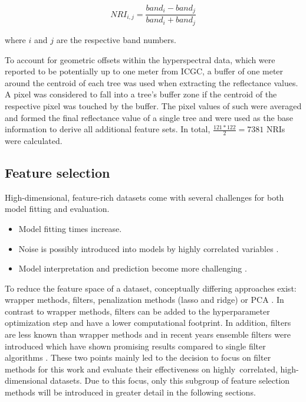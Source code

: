 \documentclass[remotesensing,article,submit,moreauthors,pdftex]{Definitions/mdpi}
\begin{document}
\begin{equation}
	NRI_{i,j} = \frac{band_{i} - band_{j}}{band_{i} + band_{j}}
\end{equation}

\noindent
where \(i\) and \(j\) are the respective band numbers.

\bigbreak{}

To account for geometric offsets within the hyperspectral data, which were reported to be potentially up to one meter from \ac{ICGC}, a buffer of one meter around the centroid of each tree was used when extracting the reflectance values.
A pixel was considered to fall into a tree's buffer zone if the centroid of the respective pixel was touched by the buffer.
The pixel values of such were averaged and formed the final reflectance value of a single tree and were used as the base information to derive all additional feature sets.
In total, \(\frac{121*122}{2} = 7381\) NRIs were calculated.

\subsection{Feature selection}

High-dimensional, feature-rich datasets come with several challenges for both model fitting and evaluation.

\begin{itemize}
	\item Model fitting times increase.
	\item Noise is possibly introduced into models by highly correlated variables \cite{johnstoneiainm.2009}.
	\item Model interpretation and prediction become more challenging \cite{johnstoneiainm.2009}.
\end{itemize}

To reduce the feature space of a dataset, conceptually differing approaches exist: wrapper methods, filters, penalization methods (lasso and ridge) or \ac{PCA} \cite{bommert2020, das2001, guyon2003, jolliffe2016}.
In contrast to wrapper methods, filters can be added to the hyperparameter optimization step and have a lower computational footprint.
In addition, filters are less known than wrapper methods and in recent years ensemble filters were introduced which have shown promising results compared to single filter algorithms \cite{drotar2017}.
These two points mainly led to the decision to focus on filter methods for this work and evaluate their effectiveness on highly\ correlated, high-dimensional datasets.
Due to this focus, only this subgroup of feature selection methods will be introduced in greater detail in the following sections.
\end{document}
